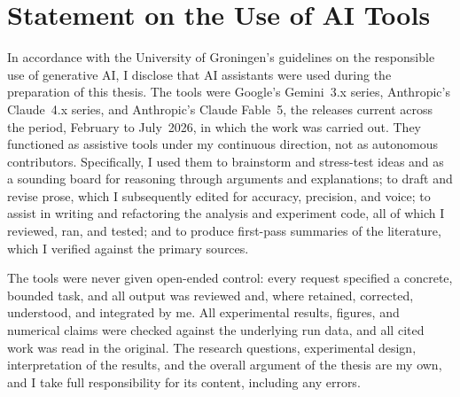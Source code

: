 \section*{Statement on the Use of AI Tools}
\label{sec:ai_statement}

In accordance with the University of Groningen's guidelines on the responsible
use of generative AI, I disclose that AI assistants were used during the
preparation of this thesis. The tools were Google's Gemini~3.x series,
Anthropic's Claude~4.x series, and Anthropic's Claude Fable~5, the releases
current across the period, February to July~2026, in which the work was
carried out. They
functioned as assistive tools under my continuous direction, not as autonomous
contributors. Specifically, I used them to brainstorm and stress-test ideas and
as a sounding board for reasoning through arguments and explanations; to draft
and revise prose, which I subsequently edited for accuracy, precision, and
voice; to assist in writing and refactoring the analysis and experiment code,
all of which I reviewed, ran, and tested; and to produce first-pass summaries
of the literature, which I verified against the primary sources.

The tools were never given open-ended control: every request specified a
concrete, bounded task, and all output was reviewed and, where retained,
corrected, understood, and integrated by me. All experimental results, figures,
and numerical claims were checked against the underlying run data, and all cited
work was read in the original. The research questions, experimental design,
interpretation of the results, and the overall argument of the thesis are my
own, and I take full responsibility for its content, including any errors.
